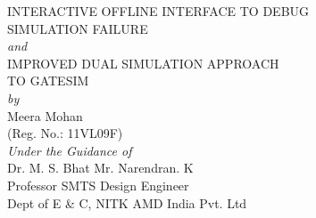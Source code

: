 \documentclass[a4paper,12pt]{report}
\begin{document}
\begin{titlepage}
\begin{center}
{\Large INTERACTIVE OFFLINE INTERFACE TO DEBUG}\\
\vspace{3.5pt}
{\Large SIMULATION FAILURE}\\
\vspace{7pt}
{\emph{and}}\\
\vspace{7pt}
{\Large IMPROVED DUAL SIMULATION APPROACH}\\
\vspace{3.5pt}
{\Large TO GATESIM}\\

\vspace{15pt}
\textit {by} \\
\vspace{10pt}
{\Large {Meera Mohan}}\\ 
{(Reg. No.: 11VL09F)}\\
\vspace{15pt}
{\em Under the Guidance of} \\

\vspace{10pt}
{\Large {Dr. M. S. Bhat \hspace{1in} Mr. Narendran. K}} \\
\hspace{-0.05in} Professor \hspace{2in} SMTS Design Engineer\\
\hspace{-0.05in}Dept of E \& C, NITK \hspace{1.45in} AMD India Pvt. Ltd\\
\vspace{-0.05in}

%
\vspace{-0.05in}


\end{center}
\end{titlepage}
\end{document}
